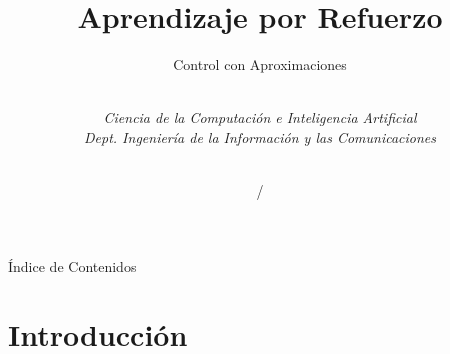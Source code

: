 \documentclass[10pt, envcountsect, handout, aspectratio=1610, hyperref={hypertexnames=true}]{beamer}
\title[Aprendizaje por Refuerzo]{Aprendizaje por Refuerzo}
\subtitle{Control con Aproximaciones} %
\author[L. D. Hernández] %
{%
	\sc{Luis Daniel Hernández Molinero }\\ %
	\textit{Ciencia de la Computación e Inteligencia Artificial}\\  %
	\textit{Dept. Ingeniería de la Información y las Comunicaciones}\\  %
	\\   %
}
\institute[DIIC]%
{
	\textit{Universidad de Murcia}
}
\date{\arabic{lastyear} / \the\year} %
\begin{document}
	






\begin{frame}[plain]
	\titlepage
\end{frame}


\begin{frame}{Índice de Contenidos}
	\tableofcontents 
	
\note{

}

\end{frame}




\section{Introducción}
\end{document}
